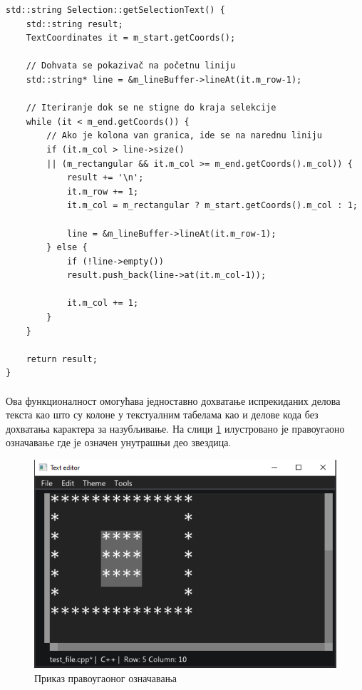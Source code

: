 \documentclass[12pt,oneside]{memoir}
\begin{document}
\begin{verbatim}
std::string Selection::getSelectionText() {
	std::string result;
	TextCoordinates it = m_start.getCoords();
	
	// Dohvata se pokazivač na početnu liniju
	std::string* line = &m_lineBuffer->lineAt(it.m_row-1);
	
	// Iteriranje dok se ne stigne do kraja selekcije
	while (it < m_end.getCoords()) {
		// Ako je kolona van granica, ide se na narednu liniju
		if (it.m_col > line->size() 
		|| (m_rectangular && it.m_col >= m_end.getCoords().m_col)) {
			result += '\n';
			it.m_row += 1;
			it.m_col = m_rectangular ? m_start.getCoords().m_col : 1;
			
			line = &m_lineBuffer->lineAt(it.m_row-1);
		} else {
			if (!line->empty())
			result.push_back(line->at(it.m_col-1));
			
			it.m_col += 1;
		}
	}
	
	return result;
}
\end{verbatim}

\paragraph{}
Ова функционалност омогућава једноставно дохватање испрекиданих делова
текста као што су колоне у текстуалним табелама као и делове кода без дохватања
карактера за назубљивање. На слици \ref{fig:rectangular_selection} илустровано
је правоугаоно означавање где је означен унутрашњи део звездица.

\begin{figure}[!ht]
	\centering
	\includegraphics[width=1.0\textwidth]{images/rectangular_selection.png}
	\caption{Приказ правоугаоног означавања}
	\label{fig:rectangular_selection}
\end{figure}
\literatura
\end{document}
